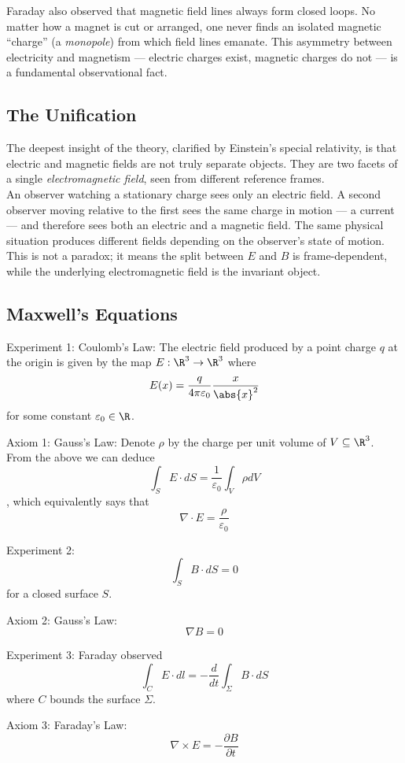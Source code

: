 \documentclass[a4paper]{article}
\begin{document}
Faraday also observed that magnetic field lines always form closed loops. No matter how a magnet is cut or arranged, one never finds an isolated magnetic ``charge'' (a \textit{monopole}) from which field lines emanate. This asymmetry between electricity and magnetism --- electric charges exist, magnetic charges do not --- is a fundamental observational fact. 

\subsection*{The Unification}
The deepest insight of the theory, clarified by Einstein's special relativity, is that electric and magnetic fields are not truly separate objects. They are two facets of a single \textit{electromagnetic field}, seen from different reference frames. \\

An observer watching a stationary charge sees only an electric field. A second observer moving relative to the first sees the same charge in motion --- a current --- and therefore sees both an electric and a magnetic field. The same physical situation produces different fields depending on the observer's state of motion. This is not a paradox; it means the split between $E$ and $B$ is frame-dependent, while the underlying electromagnetic field is the invariant object. 

\subsection*{Maxwell's Equations}
Experiment 1: Coulomb's Law: The electric field produced by a point charge $q$ at the origin is given by the map $E:\R^3\to\R^3$ where $$E(x)=\frac{q}{4\pi\varepsilon_0}\frac{x}{\abs{x}^2}$$ for some constant $\varepsilon_0\in\R$. 

Axiom 1: Gauss's Law: Denote $\rho$ by the charge per unit volume of $V\subseteq\R^3$. From the above we can deduce $$\int_SE\cdot dS=\frac{1}{\varepsilon_0}\int_V\rho dV$$, which equivalently says that $$\nabla\cdot E=\frac{\rho}{\varepsilon_0}$$


Experiment 2: $$\int_SB\cdot dS=0$$ for a closed surface $S$. 

Axiom 2: Gauss's Law: $$\nabla B=0$$

Experiment 3: Faraday observed $$\int_CE\cdot dl=-\frac{d}{dt}\int_\Sigma B\cdot dS$$ where $C$ bounds the surface $\Sigma$. 

Axiom 3: Faraday's Law: $$\nabla\times E=-\frac{\partial B}{\partial t}$$
\end{document}
